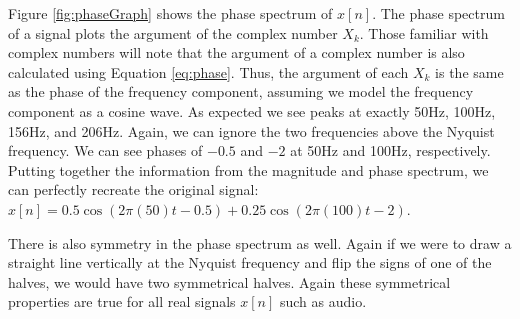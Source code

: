Figure \ref{fig:phaseGraph} shows the phase spectrum of $x[n]$.  The phase spectrum of a signal plots
the argument of the complex number $X_k$.  Those familiar with complex numbers will note that
 the argument of a complex number is also calculated 
using Equation \ref{eq:phase}.  Thus, the argument of each $X_k$ is the same as the phase of
the frequency component, assuming we model the frequency component 
as a cosine wave.  As expected we see peaks at exactly 50Hz, 100Hz, 156Hz, and 206Hz.  Again, we can 
ignore the two frequencies above the Nyquist frequency.  We can see phases of $-0.5$ and $-2$ at 50Hz and 
100Hz, respectively.  Putting together the information from the magnitude and
phase spectrum, we can perfectly recreate the original signal: 
$x[n] = 0.5\cos(2\pi(50)t - 0.5) + 0.25\cos(2\pi(100)t - 2)$.

There is also symmetry in the phase spectrum as well.  Again if we were to draw a straight line vertically at
the Nyquist frequency and flip the signs of one of the halves, we would have two symmetrical halves.  Again
these symmetrical properties are true for all real signals $x[n]$ such as audio.
